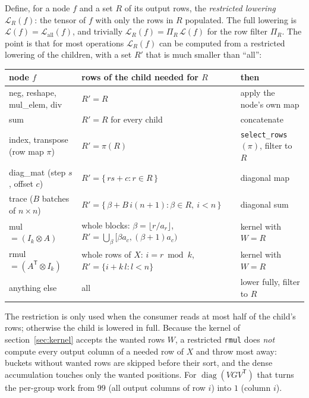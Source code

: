 \documentclass[11pt,a4paper]{article}
\newcommand{\code}[1]{\texttt{#1}}
\newcommand{\T}{\mathsf{T}}
\begin{document}
Define, for a node $f$ and a set $R$ of its output rows, the \emph{restricted lowering}
$\mathcal{L}_R(f)$: the tensor of $f$ with only the rows in $R$ populated. The full lowering is
$\mathcal{L}(f) = \mathcal{L}_{\text{all}}(f)$, and trivially
$\mathcal{L}_R(f) = \Pi_R\,\mathcal{L}(f)$ for the row filter $\Pi_R$. The point is that for most
operations $\mathcal{L}_R(f)$ can be computed from a restricted lowering of the children, with a
set $R'$ that is much smaller than ``all'':
\begin{center}
\footnotesize
\setlength{\tabcolsep}{4pt}
\begin{tabular}{lll}
\toprule
node $f$ & rows of the child needed for $R$ & then \\
\midrule
neg, reshape, mul\_elem, div & $R' = R$ & apply the node's own map \\
sum & $R' = R$ for every child & concatenate \\
index, transpose (row map $\pi$) & $R' = \pi(R)$ & \code{select\_rows}$(\pi)$, filter to $R$ \\
diag\_mat (step $s$, offset $c$) & $R' = \{\, r s + c : r \in R \,\}$ & diagonal map \\
trace ($B$ batches of $n\times n$) & $R' = \{\, \beta + B\,i(n{+}1) : \beta \in R,\ i<n \,\}$ & diagonal sum \\
mul $=(I_k\otimes A)$ & whole blocks: $\beta = \lfloor r/a_r \rfloor$, $R' = \bigcup_\beta [\beta a_c, (\beta{+}1)a_c)$ & kernel with $W=R$ \\
rmul $=(A^\T\otimes I_k)$ & whole rows of $X$: $i = r \bmod k$, $R' = \{ i + k\,l : l < n \}$ & kernel with $W=R$ \\
anything else & all & lower fully, filter to $R$ \\
\bottomrule
\end{tabular}
\end{center}
The restriction is only used when the consumer reads at most half of the child's rows; otherwise the
child is lowered in full. Because the kernel of section~\ref{sec:kernel} accepts the wanted rows
$W$, a restricted \code{rmul} does \emph{not} compute every output column of a needed row of $X$ and
throw most away: buckets without wanted rows are skipped before their sort, and the dense
accumulation touches only the wanted positions. For $\operatorname{diag}(VGV^\T)$ that turns the
per-group work from $99$ (all output columns of row $i$) into $1$ (column $i$).
\end{document}
